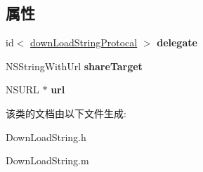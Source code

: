 \subsection*{属性}
\begin{DoxyCompactItemize}
\item 
\hypertarget{interface_down_load_string_a0fbed2e90e2d2f1c6b734b81d91d0f52}{id$<$ \hyperlink{protocoldown_load_string_protocal-p}{down\-Load\-String\-Protocal} $>$ {\bfseries delegate}}\label{interface_down_load_string_a0fbed2e90e2d2f1c6b734b81d91d0f52}

\item 
\hypertarget{interface_down_load_string_a3d0c4ef30aebcc94712bc2b36057b459}{N\-S\-String\-With\-Url {\bfseries share\-Target}}\label{interface_down_load_string_a3d0c4ef30aebcc94712bc2b36057b459}

\item 
\hypertarget{interface_down_load_string_ae12cc5c4571830fda3f931a45198d352}{N\-S\-U\-R\-L $\ast$ {\bfseries url}}\label{interface_down_load_string_ae12cc5c4571830fda3f931a45198d352}

\end{DoxyCompactItemize}


该类的文档由以下文件生成\-:\begin{DoxyCompactItemize}
\item 
Down\-Load\-String.\-h\item 
Down\-Load\-String.\-m\end{DoxyCompactItemize}
